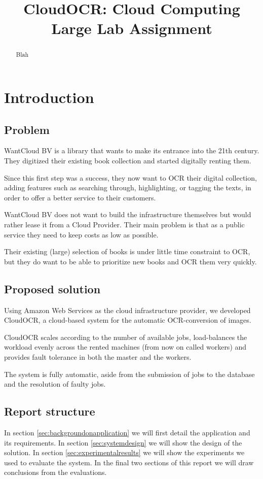 \documentclass[a4paper]{IEEEtran}
\title{CloudOCR: Cloud Computing Large Lab Assignment}
\author{
	\IEEEauthorblockN{Tiago Mota \\}
	\IEEEauthorblockA{Email: neozflux@gmail.com \\}
	\and
	\IEEEauthorblockN{Eddy Bertoluzzo \\}
	\IEEEauthorblockA{Email: eddy.bertoluzzo@gmail.com \\}
	\and
	\IEEEauthorblockN{David Hoepelman\\}
	\IEEEauthorblockA{Email: dhoepelman@gmail.com\\}
	\and
	\IEEEauthorblockN{Course instructor: Alexandru Iosup\\}
	\IEEEauthorblockA{Email: A.Iosup@tudelft.nl \\}
}
\begin{document}
\maketitle

\begin{abstract}

Blah
\end{abstract}

\section{Introduction}


\subsection*{Problem}

WantCloud BV is a library that wants to make its entrance into the 21th century. They digitized their existing book collection and started digitally renting them.

Since this first step was a success, they now want to OCR their digital collection, adding features such as searching through, highlighting, or tagging the texts, in order to offer a better service to their customers.

WantCloud BV does not want to build the infrastructure themselves but would rather lease it from a Cloud Provider. Their main problem is that as a public service they need to keep costs as low as possible.

Their existing (large) selection of books is under little time constraint to OCR, but they do want to be able to prioritize new books and OCR them very quickly.

\subsection*{Proposed solution}
Using Amazon Web Services as the cloud infrastructure provider, we developed CloudOCR, a cloud-based system for the automatic OCR-conversion of images.

CloudOCR scales according to the number of available jobs, load-balances the workload evenly across the rented machines (from now on called workers) and provides fault tolerance in both the master and the workers. 

The system is fully automatic, aside from the submission of jobs to the database and the resolution of faulty jobs.

\subsection*{Report structure}
In section \ref{sec:backgroundonapplication} we will first detail the application and its requirements. In section \ref{sec:systemdesign} we will show the design of the solution. In section \ref{sec:experimentalresults} we will show the experiments we used to evaluate the system.
In the final two sections of this report we will draw conclusions from the evaluations.
\end{document}
